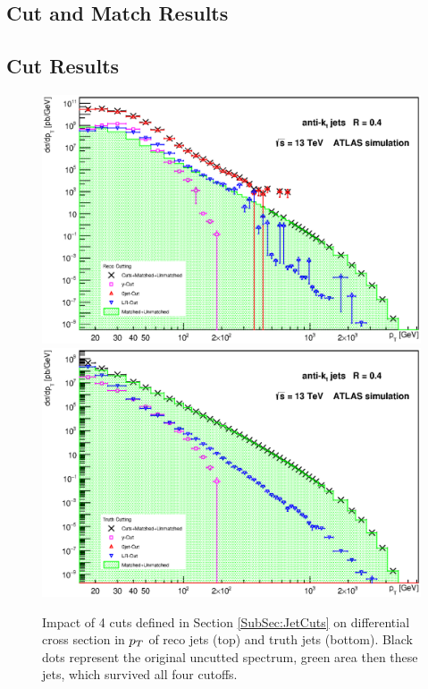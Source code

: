 \begin{appendices}

\chapter{Cut and Match Results}
\label{App:CutAndMatchingResults}

\newpage 

\section{Cut Results}
\label{sec:CutResults}

\begin{figure}[H]
  \centering
  \includegraphics[width=\textwidth]{Chapter3/SignalCutting.eps}
  \includegraphics[width=\textwidth]{Chapter3/TruthCutting.eps}
  \caption{Impact of 4 cuts defined in Section \ref{SubSec:JetCuts} on
  differential cross section in $p_{T}$ of reco jets (top) and truth jets
  (bottom). Black dots represent the original uncutted spectrum, green area then
  these jets, which survived all four cutoffs.}
  \label{fig:Cutting}
\end{figure}


\end{appendices}
